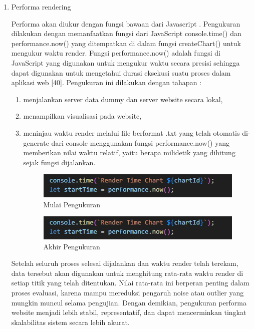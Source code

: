 \begin{enumerate}
	\item Performa rendering

	Performa akan diukur dengan fungsi bawaan dari Javascript \cite{Persson2021} \cite{Persson2021}. Pengukuran dilakukan dengan memanfaatkan fungsi dari JavaScript console.time() dan performance.now() yang ditempatkan di dalam fungsi createChart() untuk mengukur waktu render. Fungsi performance.now() adalah fungsi di JavaScript yang digunakan untuk mengukur waktu secara presisi sehingga dapat digunakan untuk mengetahui durasi eksekusi suatu proses dalam aplikasi web [40]. Pengukuran ini dilakukan dengan tahapan : 
	\begin{enumerate}[label={\arabic*.}]
		\item menjalankan server data dummy dan server website secara lokal,
		\item menampilkan visualisasi pada website, 
		\item meninjau waktu render melalui file berformat .txt yang telah otomatis di-generate dari console menggunakan fungsi performance.now() yang memberikan nilai waktu relatif, yaitu berapa milidetik yang dihitung sejak fungsi dijalankan. 
			\begin{figure}[H]
			\centering
			\includegraphics[width=0.8\linewidth]{gambar/Metodologi/Start Performance Now.png}
			\caption{Mulai Pengukuran}
			\label{Mulai Pengukuran Render}
		\end{figure}
			\begin{figure}[H]
			\centering
			\includegraphics[width=0.8\linewidth]{gambar/Metodologi/Start Performance Now.png}
			\caption{Akhir Pengukuran}
			\label{Akhir Pengukuran Render}
		\end{figure}
	\end{enumerate}
			Setelah seluruh proses selesai dijalankan dan waktu render telah terekam, data tersebut akan digunakan untuk menghitung rata-rata waktu render di setiap titik yang telah ditentukan. Nilai rata-rata ini berperan penting dalam proses evaluasi, karena mampu mereduksi pengaruh noise atau outlier yang mungkin muncul selama pengujian. Dengan demikian, pengukuran performa website menjadi lebih stabil, representatif, dan dapat mencerminkan tingkat skalabilitas sistem secara lebih akurat.
	

\end{enumerate}
